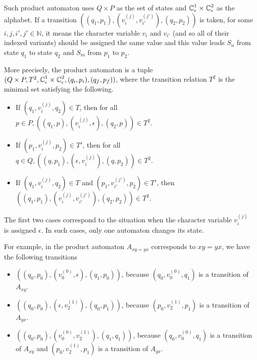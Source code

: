 \documentclass{llncs}
\begin{document}
Such product automaton uses $Q\times P$ as the set of states and $\mbox{$\mathbb{C}$}^1_\epsilon \times \mbox{$\mathbb{C}$}^2_\epsilon$ as the alphabet. If a transition $((q_1,p_1), (v_i^{(j)},v_{i'}^{(j')}),(q_2,p_2))$ is taken, for some $i,j,i',j' \in \mathbb{N}$, it means the character variable $v_i$ and $v_{i'}$ (and so all of their indexed variants) should be assigned the same value and this value leads $S_n$ from state $q_1$ to state $q_2$ and $S_m$ from $p_1$ to $p_2$.

More precisely, the product automaton is a tuple $(Q\times P, T^2, \mbox{$\mathbb{C}$}^1_\epsilon \times \mbox{$\mathbb{C}$}^2_\epsilon, (q_i,p_i),(q_f,p_f))$, where the transition relation $T^2$ is the minimal set satisfying the following.

\begin{itemize}
\item If $(q_1,v_i^{(j)},q_2) \in T$, then for all $p\in P,((q_1,p),(v_i^{(j)},\epsilon),(q_2,p))\in T^2$.
\item If $(p_1,v_i^{(j)},p_2) \in T'$, then for all $q\in Q,((q,p_1),(\epsilon,v_i^{(j)}),(q,p_2))\in T^2$.
\item If $(q_1,v_i^{(j)},q_2) \in T$ and $(p_1,v_{i'}^{(j')},p_2) \in T'$, then $((q_1,p_1),(v_i^{(j)},v_{i'}^{(j')}),(q_2,p_2))\in T^2$.
\end{itemize}	
The first two cases correspond to the situation when the character variable $v_i^{(j)}$ is assigned $\epsilon$. In such cases, only one automaton changes its state.

For example, in the product automaton $A_{xy=yx}$ corresponds to $xy=yx$, we have the following transitions
\begin{itemize}
	\item $((q_0,p_0), (v_0^{(0)},\epsilon),(q_1,p_0))$, because $(q_0,v_0^{(0)},q_1)$ is a transition of $A_{xy}$.
	\item $((q_0,p_0), (\epsilon,v_2^{(1)}),(q_0,p_1))$, because $(p_0,v_2^{(1)},p_1)$ is a transition of $A_{yx}$.
	\item $((q_0,p_0), (v_0^{(0)},v_2^{(1)}),(q_1,q_1))$, because $(q_0,v_0^{(0)},q_1)$ is a transition of $A_{xy}$ and $(p_0,v_2^{(1)},p_1)$ is a transition of $A_{yx}$.
\end{itemize}
\end{document}

